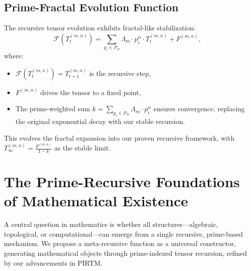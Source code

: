 \documentclass{article}
\theoremstyle{plain}
\begin{document}
\subsection{Prime-Fractal Evolution Function}
The recursive tensor evolution exhibits fractal-like stabilization:
\begin{equation}
    \mathcal{F}(T_t^{(m,n)}) = \sum_{p_i \in P_N} \Lambda_m \cdot p_i^\alpha \cdot T_t^{(m,n)} + F^{(m,n)},
\end{equation}
where:
\begin{itemize}
    \item \( \mathcal{F}(T_t^{(m,n)}) = T_{t+1}^{(m,n)} \) is the recursive step,
    \item \( F^{(m,n)} \) drives the tensor to a fixed point,
    \item The prime-weighted sum \( k = \sum_{p_i \in P_N} \Lambda_m \cdot p_i^\alpha \) ensures convergence, replacing the original exponential decay with our stable recursion.
\end{itemize}
This evolves the fractal expansion into our proven recursive framework, with \( T_\infty^{(m,n)} = \frac{F^{(m,n)}}{1 - k} \) as the stable limit.

\section{The Prime-Recursive Foundations of Mathematical Existence}
A central question in mathematics is whether all structures—algebraic, topological, or computational—can emerge from a single recursive, prime-based mechanism. We propose a meta-recursive function as a universal constructor, generating mathematical objects through prime-indexed tensor recursion, refined by our advancements in PIRTM.
\end{document}
